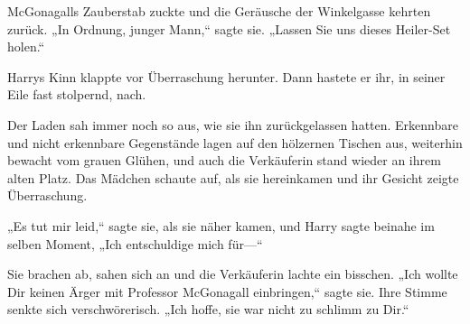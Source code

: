 McGonagalls Zauberstab zuckte und die Geräusche der Winkelgasse kehrten zurück. „In Ordnung, junger Mann,“ sagte sie. „Lassen Sie uns dieses Heiler-Set holen.“

Harrys Kinn klappte vor Überraschung herunter. Dann hastete er ihr, in seiner Eile fast stolpernd, nach.

\later

Der Laden sah immer noch so aus, wie sie ihn zurückgelassen hatten. Erkennbare und nicht erkennbare Gegenstände lagen auf den hölzernen Tischen aus, weiterhin bewacht vom grauen Glühen, und auch die Verkäuferin stand wieder an ihrem alten Platz. Das Mädchen schaute auf, als sie hereinkamen und ihr Gesicht zeigte Überraschung.

„Es tut mir leid,“ sagte sie, als sie näher kamen, und Harry sagte beinahe im selben Moment, „Ich entschuldige mich für—“

Sie brachen ab, sahen sich an und die Verkäuferin lachte ein bisschen. „Ich wollte Dir keinen Ärger mit Professor McGonagall einbringen,“ sagte sie. Ihre Stimme senkte sich verschwörerisch. „Ich hoffe, sie war nicht zu schlimm zu Dir.“

